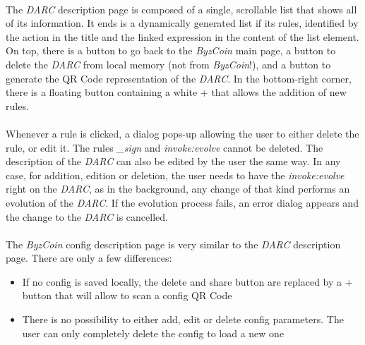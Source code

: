 \paragraph{}

The \textit{DARC} description page is composed of a single, scrollable list that shows all of its information. It ends is a dynamically generated list if its rules, identified by the action in the title and the linked expression in the content of the list element. On top, there is a button to go back to the \textit{ByzCoin} main page, a button to delete the \textit{DARC} from local memory (not from \textit{ByzCoin}!), and a button to generate the QR Code representation of the \textit{DARC}. In the bottom-right corner, there is a floating button containing a white + that allows the addition of new rules.

\paragraph{}

Whenever a rule is clicked, a dialog pops-up allowing the user to either delete the rule, or edit it. The rules \textit{\_sign} and \textit{invoke:evolve} cannot be deleted. The description of the \textit{DARC} can also be edited by the user the same way. In any case, for addition, edition or deletion, the user needs to have the \textit{invoke:evolve} right on the \textit{DARC}, as in the background, any change of that kind performs an evolution of the \textit{DARC}. If the evolution process fails, an error dialog appears and the change to the \textit{DARC} is cancelled.

\paragraph{}

The \textit{ByzCoin} config description page is very similar to the \textit{DARC} description page. There are only a few differences:

\begin{itemize}
    \item If no config is saved locally, the delete and share button are replaced by a + button that will allow to scan a config QR Code
    \item There is no possibility to either add, edit or delete config parameters. The user can only completely delete the config to load a new one
\end{itemize}


